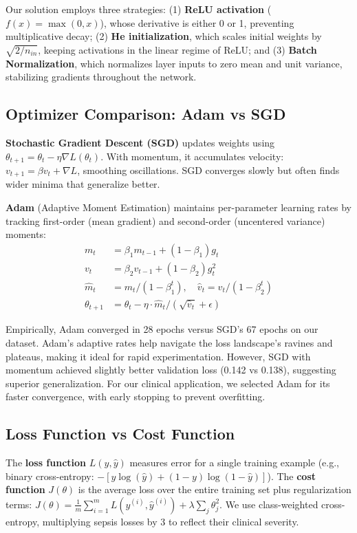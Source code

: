 \documentclass[11pt,a4paper]{article}
\begin{document}
Our solution employs three strategies: (1) \textbf{ReLU activation} ($f(x) = \max(0,x)$), whose derivative is either 0 or 1, preventing multiplicative decay; (2) \textbf{He initialization}, which scales initial weights by $\sqrt{2/n_{in}}$, keeping activations in the linear regime of ReLU; and (3) \textbf{Batch Normalization}, which normalizes layer inputs to zero mean and unit variance, stabilizing gradients throughout the network.

\subsection{Optimizer Comparison: Adam vs SGD}

\textbf{Stochastic Gradient Descent (SGD)} updates weights using $\theta_{t+1} = \theta_t - \eta \nabla L(\theta_t)$. With momentum, it accumulates velocity: $v_{t+1} = \beta v_t + \nabla L$, smoothing oscillations. SGD converges slowly but often finds wider minima that generalize better.

\textbf{Adam} (Adaptive Moment Estimation) maintains per-parameter learning rates by tracking first-order (mean gradient) and second-order (uncentered variance) moments:
\begin{align}
m_t &= \beta_1 m_{t-1} + (1-\beta_1) g_t \\
v_t &= \beta_2 v_{t-1} + (1-\beta_2) g_t^2 \\
\hat{m}_t &= m_t / (1-\beta_1^t), \quad \hat{v}_t = v_t / (1-\beta_2^t) \\
\theta_{t+1} &= \theta_t - \eta \cdot \hat{m}_t / (\sqrt{\hat{v}_t} + \epsilon)
\end{align}

Empirically, Adam converged in 28 epochs versus SGD's 67 epochs on our dataset. Adam's adaptive rates help navigate the loss landscape's ravines and plateaus, making it ideal for rapid experimentation. However, SGD with momentum achieved slightly better validation loss (0.142 vs 0.138), suggesting superior generalization. For our clinical application, we selected Adam for its faster convergence, with early stopping to prevent overfitting.

\subsection{Loss Function vs Cost Function}

The \textbf{loss function} $L(y, \hat{y})$ measures error for a single training example (e.g., binary cross-entropy: $-[y \log(\hat{y}) + (1-y)\log(1-\hat{y})]$). The \textbf{cost function} $J(\theta)$ is the average loss over the entire training set plus regularization terms: $J(\theta) = \frac{1}{m}\sum_{i=1}^m L(y^{(i)}, \hat{y}^{(i)}) + \lambda \sum_j \theta_j^2$. We use class-weighted cross-entropy, multiplying sepsis losses by 3 to reflect their clinical severity.
\end{document}
